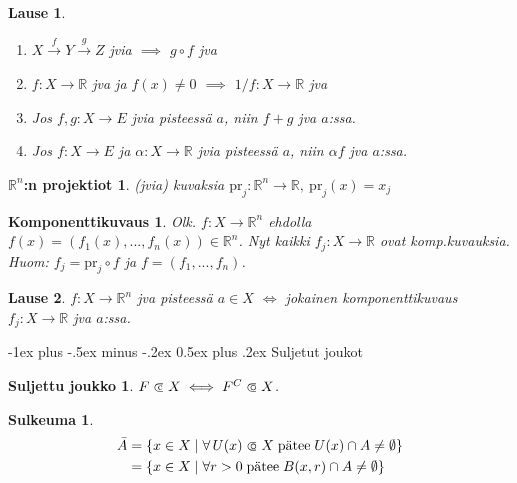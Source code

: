 \documentclass[landscape,a4paper,10pt]{article}
\makeatletter
\renewcommand{\section}{\@startsection{section}{1}{0mm}%
                                {-1ex plus -.5ex minus -.2ex}%
                                {0.5ex plus .2ex}%
                                {\color{blue}\normalfont\large\bfseries}}
\newcommand\opn{\mathrel{\ooalign{$\subset$\cr
  \hidewidth\hbox{$\circ\mkern.5mu$}\cr}}}
\newcommand\cls{\mathrel{\ooalign{$\subset$\cr
\hidewidth\raise.225ex\hbox{$\text{{\scriptsize c}}\mkern2mu$}\cr}}}
\theoremstyle{customtheoremstyle}
\newtheorem*{theorem}{Lause}
\makeatother
\begin{document}
\begin{multicols*}{3}
\begin{theorem}
  \begin{enumerate}
    \item[(1)]{$X \stackrel{f}{\rightarrow} Y \stackrel{g}{\rightarrow} Z$ jvia
      $\implies$ $g \circ f$ jva}
    \item[(2)]{$f : X \rightarrow \mathbb{R}$ jva ja $f(x) \neq 0$ $\implies$
      $1/f : X \rightarrow \mathbb{R}$ jva}
    \item[(3)]{Jos $f,g: X \rightarrow E$ jvia pisteessä $a$, niin $f+g$ jva
      $a$:ssa.}
    \item[(4)]{Jos $f: X \rightarrow E$ ja $\alpha: X \rightarrow \mathbb{R}$
      jvia pisteessä $a$, niin $\alpha f$ jva $a$:ssa.}
  \end{enumerate}
\end{theorem}

\newtheorem*{projektio}{$\mathbb{R}^n$:n projektiot}
\begin{projektio}
  (jvia) kuvaksia $\text{pr}_j : \mathbb{R}^n \rightarrow \mathbb{R},
  \: \text{pr}_j(x) = x_j$
\end{projektio}

\newtheorem*{komponenttikuvaus}{Komponenttikuvaus}
\begin{komponenttikuvaus}
  Olk. $f: X \rightarrow \mathbb{R}^n$ ehdolla $f(x) = (f_1(x), ...,
  f_n(x)) \in \mathbb{R}^n$. Nyt kaikki $f_j : X \rightarrow \mathbb{R}$ ovat
  komp.kuvauksia. Huom: $f_j = \text{pr}_j \circ f$ ja $f = (f_1,...,f_n)$.
\end{komponenttikuvaus}

\begin{theorem}
  $f: X \rightarrow \mathbb{R}^n$ jva pisteessä $a \in X$ $\iff$ jokainen
  komponenttikuvaus $f_j: X \rightarrow \mathbb{R}$ jva $a$:ssa.
\end{theorem}


\section{Suljetut joukot}
\newtheorem*{defn:closedSet}{Suljettu joukko}
\begin{defn:closedSet}
  $F \cls X \iff F^C \opn X$.
\end{defn:closedSet}

\newtheorem*{defn:closure}{Sulkeuma}
\begin{defn:closure}
  \begin{align*}
    \bar{A} &=
    \{ x \in X \; | \; \forall \, U(x) \opn X \; \text{pätee} \; U(x) \cap A \neq \emptyset \}
    \\
    &= \{ x \in X \; | \; \forall r > 0 \; \text{pätee} \; B(x,r) \cap A \neq
    \emptyset \}
  \end{align*}
\end{defn:closure}


\end{multicols*}
\end{document}
